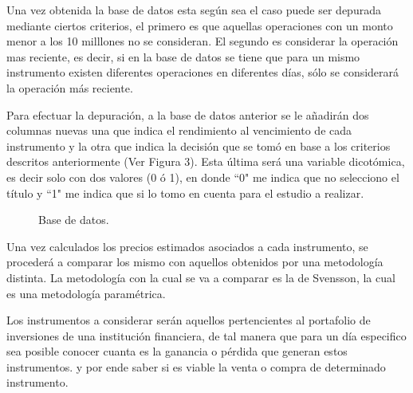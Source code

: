 \hspace{0.4cm} Una vez obtenida la base de datos esta seg\'un sea el caso puede ser depurada mediante ciertos criterios, el primero es que aquellas operaciones con un monto menor a los 10 milllones no se consideran. El segundo es considerar la operaci\'on mas reciente, es decir, si en la base de datos se tiene que para un mismo instrumento existen diferentes operaciones en diferentes d\'ias, s\'olo se considerar\'a la operaci\'on m\'as reciente.


\hspace{0.4cm} Para efectuar la depuraci\'on, a la base de datos anterior se le a\~nadir\'an dos columnas nuevas una que indica el rendimiento al vencimiento de cada instrumento y la otra que indica la decisi\'on que se tom\'o en base a los criterios descritos anteriormente (Ver Figura 3). Esta \'ultima ser\'a una variable dicot\'omica, es decir solo con dos valores (0 \'o 1), en donde ``0" me indica que no selecciono el t\'itulo y ``1" me indica que si lo tomo en cuenta para el estudio a realizar.

\begin{figure}[h]
\caption{Base de datos.}
\label{base_datos}
\end{figure}


\hspace{0.4cm} Una vez calculados los precios estimados asociados a cada instrumento, se proceder\'a a comparar los mismo con aquellos obtenidos por una metodolog\'ia distinta. La metodolog\'ia con la cual se va a comparar es la de Svensson, la cual es una metodolog\'ia param\'etrica.



\hspace{0.4cm} Los instrumentos a considerar ser\'an aquellos pertencientes al portafolio de inversiones de una instituci\'on financiera, de tal manera que para un d\'ia especifico sea posible conocer cuanta es la ganancia o p\'erdida que generan estos instrumentos. y por ende saber si es viable la venta o compra de determinado instrumento.


